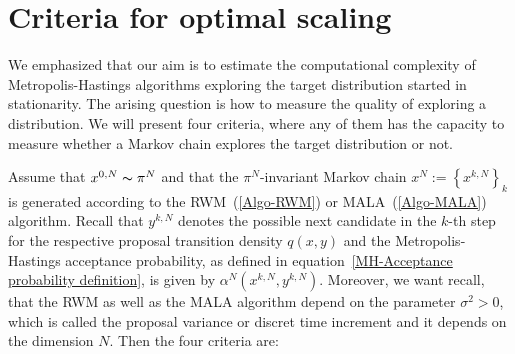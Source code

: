 \section{Criteria for optimal scaling}
\label{CC:Criteria}

We emphasized that our aim is to estimate the computational complexity of Metropolis-Hastings algorithms exploring the target distribution started in stationarity. The arising question is how to measure the quality of exploring a distribution. We will present four criteria, where any of them has the capacity to measure whether a Markov chain explores the target distribution or not. 

Assume that $ x^{0,N}  \thicksim \pi^{N} $ and that the $\pi^{N}$-invariant Markov chain $ x^{N} := \left\{ x^{k,N}\right\}_k $ is generated according to the RWM~(\ref{Algo-RWM}) or MALA~(\ref{Algo-MALA}) algorithm. Recall that $ y^{k,N} $ denotes the possible next candidate in the $k$-th step for the respective proposal transition density $ q(x,y) $ and the Metropolis-Hastings acceptance probability, as defined in equation~\ref{MH-Acceptance probability definition}, is given by $ \alpha^{N}\left(x^{k,N},y^{k,N}\right) $. Moreover, we want recall, that the RWM as well as the MALA algorithm depend on the parameter $ \sigma^2 > 0 $, which is called the proposal variance or discret time increment and it depends on the dimension $N$. Then the four criteria are:

